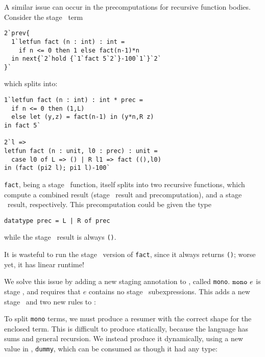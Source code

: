 A similar issue can occur in the precomputations for recursive function bodies.
Consider the stage \bbtwo\ term
\begin{lstlisting}
2`prev{
  1`letfun fact (n : int) : int = 
    if n <= 0 then 1 else fact(n-1)*n
  in next{`2`hold {`1`fact 5`2`}-100`1`}`2`
}`
\end{lstlisting}
which splits into:
\begin{lstlisting}
1`letfun fact (n : int) : int * prec = 
  if n <= 0 then (1,L) 
  else let (y,z) = fact(n-1) in (y*n,R z)
in fact 5`

2`l => 
letfun fact (n : unit, l0 : prec) : unit = 
  case l0 of L => () | R l1 => fact ((),l0)
in (fact (pi2 l); pi1 l)-100`
\end{lstlisting}
\texttt{fact}, being a stage \bbone\ function, itself splits into two recursive
functions, which compute a combined result (stage \bbone\ result and
precomputation), and a stage \bbtwo\ result, respectively. This precomputation
could be given the type
\begin{lstlisting}
datatype prec = L | R of prec
\end{lstlisting}
while the stage \bbtwo\ result is always \texttt{()}.

It is wasteful to run the stage \bbtwo\ version of \texttt{fact}, since it
always returns \texttt{()}; worse yet, it has linear runtime!

We solve this issue by adding a new staging annotation to \lang, called
\texttt{mono}. ${\tt mono}~e$ is stage \bbone, and requires that $e$ contains
no stage \bbtwo\ subexpressions. This adds a new stage \bbmono\ and two new
rules to \lang:


To split \texttt{mono} terms, we must produce a resumer with the correct shape
for the enclosed term. This is difficult to produce statically, because the
language has sums and general recursion. We instead produce it dynamically,
using a new value in \langmono, \texttt{dummy}, which can be consumed as though
it had any type:

